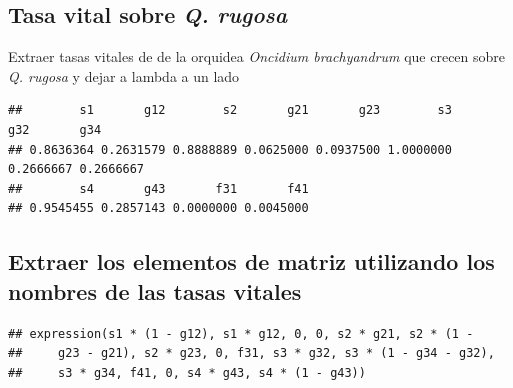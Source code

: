 \documentclass[
]{book}
\newenvironment{Shaded}{\begin{snugshade}}{\end{snugshade}}
\newcommand{\AttributeTok}[1]{\textcolor[rgb]{0.13,0.29,0.53}{#1}}
\newcommand{\DecValTok}[1]{\textcolor[rgb]{0.00,0.00,0.81}{#1}}
\newcommand{\FunctionTok}[1]{\textcolor[rgb]{0.13,0.29,0.53}{\textbf{#1}}}
\newcommand{\NormalTok}[1]{#1}
\newcommand{\OtherTok}[1]{\textcolor[rgb]{0.56,0.35,0.01}{#1}}
\newcommand{\SpecialCharTok}[1]{\textcolor[rgb]{0.81,0.36,0.00}{\textbf{#1}}}
\theoremstyle{definition}
\theoremstyle{definition}
\theoremstyle{definition}
\theoremstyle{definition}
\theoremstyle{remark}
\begin{document}
\subsection{\texorpdfstring{Tasa vital sobre \emph{Q. rugosa}}{Tasa vital sobre Q. rugosa}}\label{tasa-vital-sobre-q.-rugosa}

Extraer tasas vitales de de la orquidea \emph{Oncidium brachyandrum} que crecen sobre \emph{Q. rugosa} y dejar a lambda a un lado

\begin{Shaded}
\end{Shaded}

\begin{verbatim}
##        s1       g12        s2       g21       g23        s3       g32       g34 
## 0.8636364 0.2631579 0.8888889 0.0625000 0.0937500 1.0000000 0.2666667 0.2666667 
##        s4       g43       f31       f41 
## 0.9545455 0.2857143 0.0000000 0.0045000
\end{verbatim}

\subsection{Extraer los elementos de matriz utilizando los nombres de las tasas vitales}\label{extraer-los-elementos-de-matriz-utilizando-los-nombres-de-las-tasas-vitales}

\begin{Shaded}
\end{Shaded}

\begin{verbatim}
## expression(s1 * (1 - g12), s1 * g12, 0, 0, s2 * g21, s2 * (1 - 
##     g23 - g21), s2 * g23, 0, f31, s3 * g32, s3 * (1 - g34 - g32), 
##     s3 * g34, f41, 0, s4 * g43, s4 * (1 - g43))
\end{verbatim}
\end{document}
